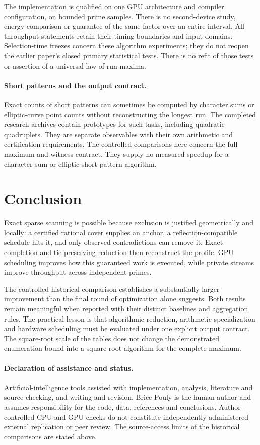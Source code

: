 \documentclass[11pt]{article}
\theoremstyle{definition}\newtheorem{remark}[theorem]{Remark}
\begin{document}
The implementation is qualified on one GPU architecture and compiler
configuration, on bounded prime samples. There is no second-device study,
energy comparison or guarantee of the same factor over an entire interval.
All throughput statements retain their timing boundaries and input domains.
Selection-time freezes concern these algorithm experiments; they do not
reopen the earlier paper's closed primary statistical tests. There is no
refit of those tests or assertion of a universal law of run maxima.

\paragraph{Short patterns and the output contract.}
Exact counts of short patterns can sometimes be computed by character sums
or elliptic-curve point counts without reconstructing the longest run.
The completed research archives contain prototypes for such tasks, including
quadratic quadruplets. They are separate observables with their own
arithmetic and certification requirements. The controlled comparisons here
concern the full maximum-and-witness contract. They supply no measured
speedup for a character-sum or elliptic short-pattern algorithm.

\section{Conclusion}
Exact sparse scanning is possible because exclusion is justified
geometrically and locally: a certified rational cover supplies an anchor,
a reflection-compatible schedule hits it, and only observed contradictions
can remove it. Exact completion and tie-preserving reduction then reconstruct
the profile. GPU scheduling improves how this guaranteed work is executed,
while private streams improve throughput across independent primes.

The controlled historical comparison establishes a substantially larger
improvement than the final round of optimization alone suggests. Both
results remain meaningful when reported with their distinct baselines and
aggregation rules. The practical lesson is that algorithmic reduction,
arithmetic specialization and hardware scheduling must be evaluated under
one explicit output contract. The square-root scale of the tables does not
change the demonstrated enumeration bound into a square-root algorithm for
the complete maximum.

\paragraph{Declaration of assistance and status.}
Artificial-intelligence tools assisted with implementation, analysis,
literature and source checking, and writing and revision. Brice Pouly is
the human author and assumes responsibility for the code, data, references
and conclusions. Author-controlled CPU and GPU checks do not constitute
independently administered external replication or peer review. The
source-access limits of the historical comparisons are stated above.
\end{document}
